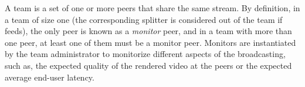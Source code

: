 
\label{sec:team_def}

A team is a set of one or more peers that share the same stream. By
definition, in a team of size one (the corresponding splitter is
considered out of the team if feeds), the only peer is known as a
\emph{monitor} peer, and in a team with more than one peer, at least
one of them must be a monitor peer. Monitors are instantiated by the
team administrator to monitorize different aspects of the
broadcasting, such as, the expected quality of the rendered video at
the peers or the expected average end-user latency.
